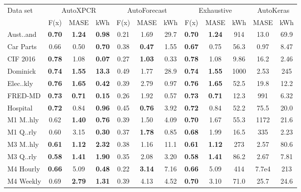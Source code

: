 
    \begin{tabular}{l|ccc|ccc||ccc||cc}
        \toprule 
        Data set & \multicolumn{3}{c}{AutoXPCR} & \multicolumn{3}{c}{AutoForecast} & \multicolumn{3}{c}{Exhaustive} & \multicolumn{2}{c}{AutoKeras} \\
          & F(x) & MASE & kWh & F(x) & MASE & kWh & F(x) & MASE & kWh & MASE & kWh \\
        \midrule
        Aust..and & \textbf{0.70} & \textbf{1.24} & \textbf{0.98} & 0.21 & 1.69 & 29.7 & \textbf{0.70} & \textbf{1.24} & 914 & 13.0 & 69.9 \\
        Car Parts & 0.66 & 0.50 & \textbf{0.70} & 0.38 & \textbf{0.47} & 1.55 & \textbf{0.67} & 0.75 & 56.3 & 0.97 & 8.47 \\
        CIF 2016 & \textbf{0.78} & 1.08 & \textbf{0.07} & 0.27 & \textbf{1.03} & 0.33 & \textbf{0.78} & 1.08 & 9.86 & 16.2 & 2.46 \\
        Dominick & \textbf{0.74} & \textbf{1.55} & \textbf{13.3} & 0.49 & 1.77 & 28.9 & \textbf{0.74} & \textbf{1.55} & 1000 & 2.53 & 245 \\
        Elec..kly & \textbf{0.76} & \textbf{1.65} & \textbf{0.42} & 0.39 & 2.79 & 0.97 & \textbf{0.76} & \textbf{1.65} & 52.5 & 19.8 & 12.2 \\
        FRED-MD & \textbf{0.73} & \textbf{0.71} & \textbf{0.15} & 0.26 & 1.92 & 0.57 & \textbf{0.73} & \textbf{0.71} & 12.3 & 991 & 6.32 \\
        Hospital & \textbf{0.72} & 0.84 & \textbf{0.96} & 0.45 & \textbf{0.76} & 3.92 & \textbf{0.72} & 0.84 & 52.2 & 75.5 & 20.0 \\
        M1 M..hly & 0.62 & \textbf{1.40} & \textbf{0.76} & 0.39 & 1.50 & 4.09 & \textbf{0.70} & 1.67 & 55.3 & 1172 & 21.6 \\
        M1 Q..rly & 0.60 & 3.15 & \textbf{0.30} & 0.37 & \textbf{1.78} & 0.85 & \textbf{0.68} & 1.99 & 16.5 & 335 & 2.23 \\
        M3 M..hly & \textbf{0.61} & \textbf{1.12} & \textbf{2.32} & 0.38 & 1.16 & 11.1 & \textbf{0.61} & \textbf{1.12} & 273 & 2.57 & 80.6 \\
        M3 Q..rly & \textbf{0.58} & \textbf{1.41} & \textbf{1.90} & 0.35 & 2.08 & 3.20 & \textbf{0.58} & \textbf{1.41} & 86.2 & 2.67 & 7.81 \\
        M4 Hourly & \textbf{0.66} & 5.09 & \textbf{0.48} & 0.22 & \textbf{3.14} & 7.16 & \textbf{0.66} & 5.09 & 414 & 7.7e4 & 213 \\
        M4 Weekly & 0.69 & \textbf{2.79} & \textbf{1.31} & 0.39 & 4.13 & 4.52 & \textbf{0.70} & 3.10 & 71.0 & 25.7 & 24.6 \\

\end{tabular}
